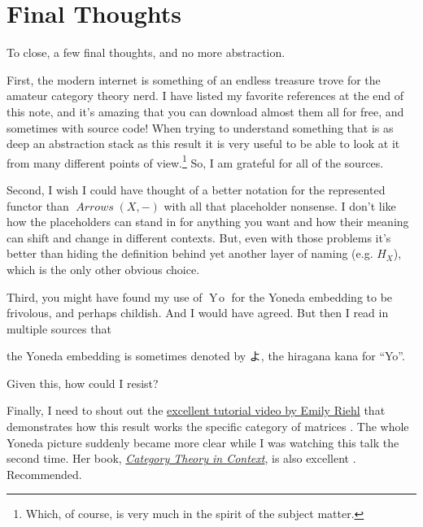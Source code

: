 \documentclass[12pt]{article}
\theoremstyle{definition}
\theoremstyle{definition}
\theoremstyle{definition}
\numberwithin{equation}{section}
\newcommand{\h}{H}                      %
\DeclareMathOperator{\Arrows}{\mathit{Arrows}}
\newcommand{\yo}{\mathop{Y\!o}}
\begin{document}
\section{Final Thoughts}

To close, a few final thoughts, and no more abstraction.

First, the modern internet is something of an endless treasure trove for the amateur category theory nerd.
I have listed my favorite references at the end of this note, and it's amazing that you can download
almost them all for free, and sometimes with source code! When trying to understand something that is as 
deep an abstraction stack as this result it is very useful to be able to look at it from many different
points of view.\footnote{Which, of course, is very much in the spirit of the subject matter.}
So, I am grateful for all of the sources. 

Second, I wish I could have thought of a better notation for the represented functor
than $\Arrows(X,-)$ with all that placeholder nonsense. I don't like how the placeholders
can stand in for anything you want and how their meaning can shift and change in different contexts.
But, even with those problems it's better than hiding the definition behind yet another
layer of naming (e.g. $\h_X$), which is the only other obvious choice. 

Third, you might have found my use of $\yo$ for the Yoneda embedding to be frivolous, and perhaps
childish. And I would have agreed. But then I read in multiple sources that
\begin{CJK}{UTF8}{min}
the Yoneda embedding is sometimes denoted by \!\!よ, the hiragana kana for ``Yo''.
\end{CJK}
Given this, how could I resist?

Finally, I need to shout out the 
\href{https://www.youtube.com/watch?v=SsgEvrDFJsM}{excellent tutorial video by Emily Riehl} 
that demonstrates how this result works
the specific category of matrices \cite{Riehl2020}. The whole Yoneda picture suddenly
became more clear while I was watching this talk the second time.
Her book, \href{https://emilyriehl.github.io/files/context.pdf}{\it Category
Theory in Context}, is also excellent \cite{Riehl2016}. Recommended.

\newpage
\end{document}
